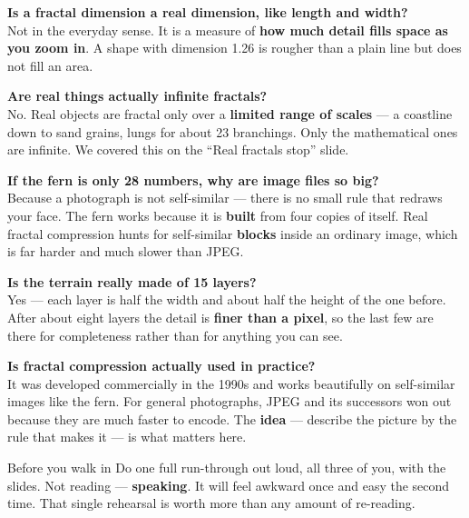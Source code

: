 \documentclass[12pt,a4paper]{article}
\newcommand{\stress}[1]{\textbf{#1}}
\begin{document}
\vspace{0.2cm}

\textbf{Is a fractal dimension a real dimension, like length and width?}\\
Not in the everyday sense. It is a measure of \stress{how much detail fills space
as you zoom in}. A shape with dimension 1.26 is rougher than a plain line but does
not fill an area.

\textbf{Are real things actually infinite fractals?}\\
No. Real objects are fractal only over a \stress{limited range of scales} ---
a coastline down to sand grains, lungs for about 23 branchings. Only the
mathematical ones are infinite. We covered this on the ``Real fractals stop'' slide.

\textbf{If the fern is only 28 numbers, why are image files so big?}\\
Because a photograph is not self-similar --- there is no small rule that redraws
your face. The fern works because it is \stress{built} from four copies of itself.
Real fractal compression hunts for self-similar \stress{blocks} inside an ordinary
image, which is far harder and much slower than JPEG.

\textbf{Is the terrain really made of 15 layers?}\\
Yes --- each layer is half the width and about half the height of the one before.
After about eight layers the detail is \stress{finer than a pixel}, so the last few
are there for completeness rather than for anything you can see.

\textbf{Is fractal compression actually used in practice?}\\
It was developed commercially in the 1990s and works beautifully on
self-similar images like the fern. For general photographs, JPEG and its successors
won out because they are much faster to encode. The \stress{idea} ---
describe the picture by the rule that makes it --- is what matters here.

\vspace{0.8cm}

\begin{notebox}{Before you walk in}
  Do one full run-through out loud, all three of you, with the slides. Not
  reading --- \stress{speaking}. It will feel awkward once and easy the second
  time. That single rehearsal is worth more than any amount of re-reading.
\end{notebox}
\end{document}
